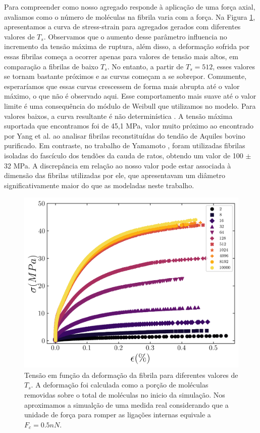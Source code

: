 \documentclass{article}
\begin{document}
    \indent Para compreender como nosso agregado responde à aplicação de uma força axial, avaliamos como o número de 
    moléculas na fibrila varia com a força. Na Figura \ref{R5}, apresentamos a curva de stress-strain para agregados 
    gerados com diferentes valores de \(T_{s}\). Observamos que o aumento desse parâmetro influencia no incremento da 
    tensão máxima de ruptura, além disso, a deformação sofrida por essas fibrilas começa a ocorrer apenas para valores 
    de tensão mais altos, em comparação a fibrilas de baixo \(T_{s}\). No entanto, a partir de \(T_{s} = 512\), esses 
    valores se tornam bastante próximos e as curvas começam a se sobrepor. Comumente, esperaríamos que essas curvas crescessem de forma mais abrupta até o valor
    máximo, o que não é observado aqui. Esse comportamento mais suave até o valor limite é uma consequência do módulo 
    de Weibull que utilizamos no modelo. Para valores baixos, a curva resultante é não determinística 
    \cite{Parkinson1997}. A tensão máxima suportada que encontramos foi de 45,1 MPa, valor muito próximo ao encontrado 
    por Yang et al. \cite{YANG2012148} ao analisar fibrilas reconstituídas do tendão de Aquiles bovino purificado. 
    Em contraste, no trabalho de Yamamoto \cite{Noritaka}, foram utilizadas fibrilas isoladas do fascículo dos tendões 
    da cauda de ratos, obtendo um valor de 100 \(\pm\) 32 MPa. A discrepância em relação ao nosso valor pode estar 
    associada à dimensão das fibrilas utilizadas por ele, que apresentavam um diâmetro significativamente maior do que 
    as modeladas neste trabalho.

    \begin{figure}[H]
        \centering
        \includegraphics[width=\textwidth]{figures/stress_strain.png}

        \caption{Tensão em função da deformação da fibrila para diferentes valores de \(T_{s}\). A deformação foi calculada
        como a porção de moléculas removidas sobre o total de moléculas no inicio da simulação. Nos aproximamos a simualção 
        de uma medida real considerando que a unidade de força para romper as ligações internas equivale a  \( F_{c} = 0.5 nN\).} 

        \label{R5}
    \end{figure}
\end{document}
